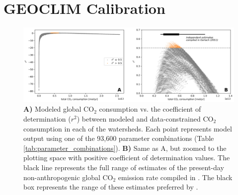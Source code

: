 \documentclass[11pt,letterpaper]{article}
\newcommand{\COtwo}{CO$_{2}$\xspace}
\begin{document}
\section*{GEOCLIM Calibration}

\begin{figure}[h!]
    \centering
    \includegraphics[width=1\textwidth]{Figures/W_vs_r2.jpg}
    \caption{\textbf{A)} Modeled global \COtwo consumption vs. the coefficient of determination ($r^{2}$) between modeled and data-constrained \COtwo consumption in each of the watersheds. Each point represents model output using one of the 93,600 parameter combinations (Table \ref{tab:parameter_combinations}). \textbf{B)} Same as A, but zoomed to the plotting space with positive coefficient of determination values. The black line represents the full range of estimates of the present-day non-anthropogenic global CO$_{2}$ emission rate compiled in \citet{Gerlach2011a}. The black box represents the range of these estimates preferred by \citet{Gerlach2011a}.}
    \label{fig:W_vs_r2}
\end{figure}
\end{document}
